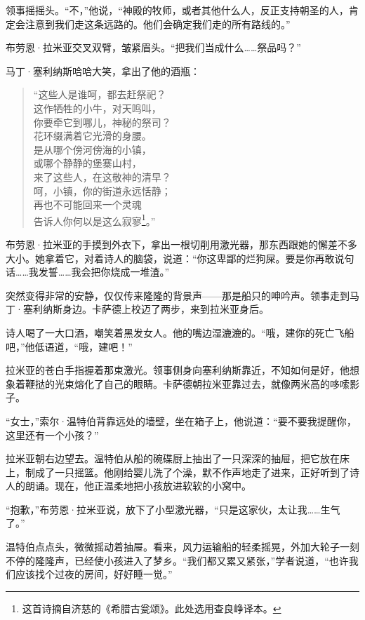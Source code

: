 \documentclass[AutoFakeBold=true]{book}
\begin{document}
领事摇摇头。``不，''他说，``神殿的牧师，或者其他什么人，反正支持朝圣的人，肯定会注意到我们走这条远路的。他们会确定我们走的所有路线的。''

布劳恩·拉米亚交叉双臂，皱紧眉头。``把我们当成什么……祭品吗？''

马丁·塞利纳斯哈哈大笑，拿出了他的酒瓶：

\begin{quote}
	{\kaishu ``这些人是谁呵，都去赶祭祀？\\
	这作牺牲的小牛，对天鸣叫，\\
	你要牵它到哪儿，神秘的祭司？\\
	花环缀满着它光滑的身腰。\\
	是从哪个傍河傍海的小镇，\\
	或哪个静静的堡寨山村，\\
	来了这些人，在这敬神的清早？\\
	呵，小镇，你的街道永远恬静；\\
	再也不可能回来一个灵魂\\
	告诉人你何以是这么寂寥}\footnote{这首诗摘自济慈的《希腊古瓮颂》。此处选用查良峥译本。}。''
\end{quote}

布劳恩·拉米亚的手摸到外衣下，拿出一根切削用激光器，那东西跟她的懈差不多大小。她拿着它，对着诗人的脑袋，说道：``你这卑鄙的烂狗屎。要是你再敢说句话……我发誓……我会把你烧成一堆渣。''

突然变得非常的安静，仅仅传来隆隆的背景声——那是船只的呻吟声。领事走到马丁·塞利纳斯身边。卡萨德上校迈了两步，来到拉米亚身后。

诗人喝了一大口酒，嘲笑着黑发女人。他的嘴边湿漉漉的。``哦，建你的死亡飞船吧，''他低语道，``哦，建吧！''

拉米亚的苍白手指握着那束激光。领事侧身向塞利纳斯靠近，不知如何是好，他想象着鞭挞的光束熔化了自己的眼睛。卡萨德朝拉米亚靠过去，就像两米高的哆嗦影子。

``女士，''索尔·温特伯背靠远处的墙壁，坐在箱子上，他说道：``要不要我提醒你，这里还有一个小孩？''

拉米亚朝右边望去。温特伯从船的碗碟厨上抽出了一只深深的抽屉，把它放在床上，制成了一只摇篮。他刚给婴儿洗了个澡，默不作声地走了进来，正好听到了诗人的朗诵。现在，他正温柔地把小孩放进软软的小窝中。

``抱歉，''布劳恩·拉米亚说，放下了小型激光器，``只是这家伙，太让我……生气了。''

温特伯点点头，微微摇动着抽屉。看来，风力运输船的轻柔摇晃，外加大轮子一刻不停的隆隆声，已经使小孩进入了梦乡。``我们都又累又紧张，''学者说道，``也许我们应该找个过夜的房间，好好睡一觉。''
\end{document}
